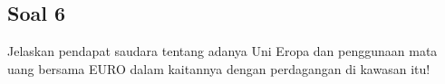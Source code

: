 \documentclass[12pt]{article}
\begin{document}


\subsection*{Soal 6}
\noindent
Jelaskan pendapat saudara tentang adanya Uni Eropa dan penggunaan mata uang bersama EURO dalam kaitannya dengan perdagangan di kawasan itu!\\
\end{document}
